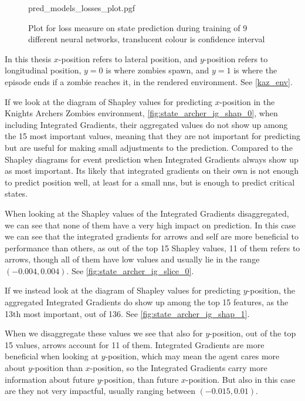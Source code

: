 \documentclass[UKenglish]{uiomasterthesis}
\begin{document}
\begin{figure}[H]
\centering
{pred_models_losses_plot.pgf}
\caption{Plot for loss measure on state prediction during training of 9 different neural networks, translucent colour is confidence interval}
\label{fig:state_archer_losses}
\end{figure}

In this thesis $x$-position refers to lateral position, and $y$-position refers to longitudinal position, $y=0$ is where zombies spawn, and $y=1$ is where the episode ends if a zombie reaches it, in the rendered environment. See \cref{kaz_env}.

If we look at the diagram of Shapley values for predicting $x$-position in the Knights Archers Zombies environment, \cref{fig:state_archer_ig_shap_0}, when including Integrated Gradients, their aggregated values do not show up among the 15 most important values, meaning that they are not important for predicting but are useful for making small adjustments to the prediction. Compared to the Shapley diagrams for event prediction when Integrated Gradients always show up as most important. Its likely that integrated gradients on their own is not enough to predict position well, at least for a small \acp{nn}, but is enough to predict critical states.

When looking at the Shapley values of the Integrated Gradients disaggregated, we can see that none of them have a very high impact on prediction. In this case we can see that the integrated gradients for arrows and self are more beneficial to performance than others, as out of the top 15 Shapley values, 11 of them refers to arrows, though all of them have low values and usually lie in the range $(-0.004, 0.004)$. See \cref{fig:state_archer_ig_slice_0}. 

If we instead look at the diagram of Shapley values for predicting $y$-position, the aggregated Integrated Gradients do show up among the top 15 features, as the 13th most important, out of 136. See \cref{fig:state_archer_ig_shap_1}.

When we disaggregate these values we see that also for $y$-position, out of the top 15 values, arrows account for 11 of them. Integrated Gradients are more beneficial when looking at $y$-position, which may mean the agent cares more about $y$-position than $x$-position, so the Integrated Gradients carry more information about future $y$-position, than future $x$-position. But also in this case are they not very impactful, usually ranging between $(-0.015,0.01)$.
\end{document}
